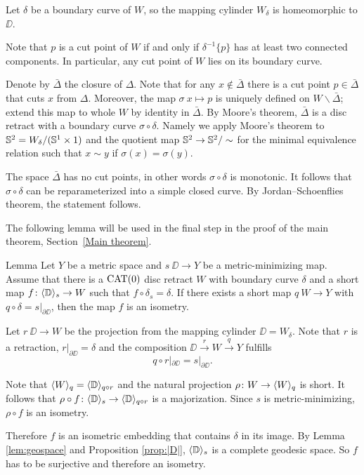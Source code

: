 Let $\delta$ be a boundary curve of $W$, so the mapping cylinder $W_\delta$ is homeomorphic to $\DD$.

Note that $p$ is a cut point of $W$ if and only if $\delta^{-1}\{p\}$ has at least two connected components.
In particular, any cut point of $W$ lies on its boundary curve.

Denote by $\bar\Delta$ the closure of $\Delta$.
Note that for any $x\notin\bar\Delta$ there is a cut point $p\in\bar\Delta$ that cuts $x$ from $\Delta$.
Moreover, the map $\sigma\:x\mapsto p$ is uniquely defined on $W\backslash\bar\Delta$;
extend this map to whole $W$ by identity in $\bar\Delta$.
By Moore's theorem, $\bar\Delta$ is a disc retract with a boundary curve $\sigma\circ\delta$.
Namely we apply Moore's theorem to $\mathbb{S}^2= W_\delta/(\mathbb{S}^1\times 1)$ and the quotient map $\mathbb{S}^2\to \mathbb{S}^2/\sim$ for the minimal equivalence relation such that $x\sim y$ if $\sigma(x)=\sigma(y)$.

The space $\bar\Delta$ has no cut points, in other words $\sigma\circ\delta$ is monotonic.
It follows that $\sigma\circ\delta$ can be reparameterized into a simple closed curve.
By Jordan--Schoenflies theorem, the statement follows.
\qeds

The following lemma will be used in the final step in the proof of the main theorem, Section~\ref{Main theorem}.

\begin{thm}{Lemma}\label{lem:maj is isom}
Let $Y$ be a metric space and $s\:\DD\to Y$ be a metric-minimizing map.
Assume that there is a $\mathop{\rm CAT}\nolimits(0)$ disc retract $W$ with boundary curve $\delta$ and a short map $f\colon\langle\mathbb{D}\rangle_s \to W$
such that $f\circ \delta_s=\delta$. If there exists a short map 
$q\: W\to Y$ with $q\circ \delta=s|_{\partial \DD}$, then the map $f$ is an isometry.
\end{thm}

Let $r\:\DD\to W$ be the projection from the mapping cylinder $\DD=W_\delta$. 
Note that $r$ is a retraction, $r|_{\partial \DD}=\delta$ and the composition $\DD\xrightarrow{r}W\xrightarrow{q} Y$ fulfills \[q\circ r|_{\partial \DD}=s|_{\partial \DD}.\]

Note that  $\langle W\rangle_q=\langle\mathbb{D}\rangle_{q\circ r}$ and the natural projection $\rho\colon W\to \langle W\rangle_q$ is short.
It follows that $\rho\circ f\colon \langle\mathbb{D}\rangle_s\to \langle\mathbb{D}\rangle_{q\circ r}$ is a majorization.
Since $s$ is metric-minimizing, $\rho\circ f$ is an isometry. 

Therefore $f$ is an isometric embedding that contains $\delta$
in its image. 
By Lemma \ref{lem:geospace} and Proposition \ref{prop:|D|}, $\langle\mathbb{D}\rangle_s$ is a complete geodesic space.
So $f$ has to be surjective and therefore an isometry.
\qeds
